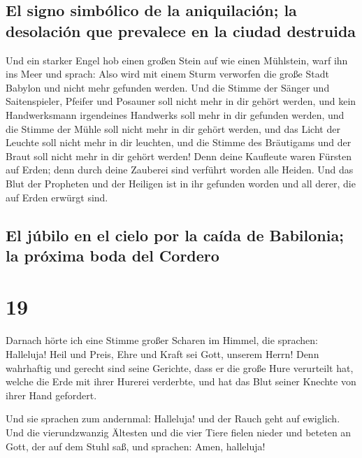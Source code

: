 \hypertarget{el-signo-simbuxf3lico-de-la-aniquilaciuxf3n-la-desolaciuxf3n-que-prevalece-en-la-ciudad-destruida}{%
\subsection{El signo simbólico de la aniquilación; la desolación que
prevalece en la ciudad
destruida}\label{el-signo-simbuxf3lico-de-la-aniquilaciuxf3n-la-desolaciuxf3n-que-prevalece-en-la-ciudad-destruida}}

 Und ein starker Engel hob einen großen Stein auf wie
einen Mühlstein, warf ihn ins Meer und sprach: Also wird mit einem Sturm
verworfen die große Stadt Babylon und nicht mehr gefunden werden.
 Und die Stimme der Sänger und Saitenspieler, Pfeifer und
Posauner soll nicht mehr in dir gehört werden, und kein Handwerksmann
irgendeines Handwerks soll mehr in dir gefunden werden, und die Stimme
der Mühle soll nicht mehr in dir gehört werden,  und das
Licht der Leuchte soll nicht mehr in dir leuchten, und die Stimme des
Bräutigams und der Braut soll nicht mehr in dir gehört werden! Denn
deine Kaufleute waren Fürsten auf Erden; denn durch deine Zauberei sind
verführt worden alle Heiden.  Und das Blut der Propheten
und der Heiligen ist in ihr gefunden worden und all derer, die auf Erden
erwürgt sind.

\hypertarget{el-juxfabilo-en-el-cielo-por-la-cauxedda-de-babilonia-la-pruxf3xima-boda-del-cordero}{%
\subsection{El júbilo en el cielo por la caída de Babilonia; la próxima
boda del
Cordero}\label{el-juxfabilo-en-el-cielo-por-la-cauxedda-de-babilonia-la-pruxf3xima-boda-del-cordero}}

\hypertarget{section-18}{%
\section{19}\label{section-18}}

 Darnach hörte ich eine Stimme großer Scharen im Himmel,
die sprachen: Halleluja! Heil und Preis, Ehre und Kraft sei Gott,
unserem Herrn!  Denn wahrhaftig und gerecht sind seine
Gerichte, dass er die große Hure verurteilt hat, welche die Erde mit
ihrer Hurerei verderbte, und hat das Blut seiner Knechte von ihrer Hand
gefordert.

 Und sie sprachen zum andernmal: Halleluja! und der Rauch
geht auf ewiglich.  Und die vierundzwanzig Ältesten und
die vier Tiere fielen nieder und beteten an Gott, der auf dem Stuhl saß,
und sprachen: Amen, halleluja!

